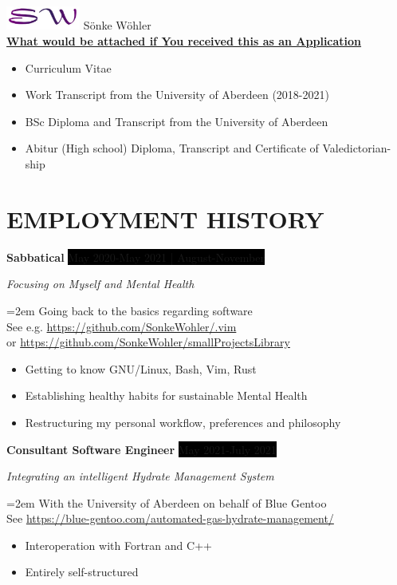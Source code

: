 \documentclass[paper=a4,fontsize=11pt]{scrartcl} %
\newcommand{\sepspace}{\vspace*{1em}}    %
\newcommand{\NewPart}[1]{\section*{\uppercase{{#1}}}}
\newcommand{\EducationEntry}[4]{
  \noindent \textbf{#1} \hfill      %
    \colorbox{Black}{%
      \parbox{6em}{%
      \hfill\color{White}#2}} \par  %
      \noindent \textit{#3} \par        %
      \noindent\hangindent=2em\hangafter=0 \small #4 %
    \normalsize \par}
\newcommand{\WorkEntry}[4]{          %
  \noindent \textbf{#1} \hfill      %
  \colorbox{Black}{\color{White}#2} \par  %
  \noindent \textit{#3} \par              %
  \noindent\hangindent=2em\hangafter=0 \small #4 %
  \normalsize \par}
\begin{document}
  \sepspace

  \includegraphics[height=0.78cm]{signature}\hspace{2.5cm}
  \hfill
  \MyDate
  \vspace{5pt}
  S\"onke W\"ohler  \\

  \vfill
  \footnotesize
  \textbf{\underline{What would be attached if You received this as an Application}}
  \begin{itemize}[noitemsep,topsep=0pt]
    \item Curriculum Vitae
    \item Work Transcript from the University of Aberdeen (2018-2021)
    \item BSc Diploma and Transcript from the University of Aberdeen
    \item Abitur (High school) Diploma, Transcript and Certificate of Valedictorian-ship
  \end{itemize}


  \StylisedName
  \SameAddress

\sepspace

\NewPart{Employment History}{}

\WorkEntry{Sabbatical}{May 2020-May 2021 | August-November}{Focusing on
  Myself and Mental Health}{Going back to the basics regarding software \\
  \hspace{5pt}
  \footnotesize See
  e.g. \textcolor{headerColor}{\url{https://github.com/SonkeWohler/.vim}}  \\
  or
  \textcolor{headerColor}{\url{https://github.com/SonkeWohler/smallProjectsLibrary}}
  \vspace{5pt}
  \begin{itemize}[noitemsep,topsep=0pt]
    \item Getting to know GNU/Linux, Bash, Vim, Rust
    \item Establishing healthy habits for sustainable Mental Health
    \item Restructuring my personal workflow, preferences and philosophy
  \end{itemize}
}

\sepspace

\WorkEntry{Consultant Software Engineer}{May 2021-July 2021}{Integrating an intelligent
Hydrate Management System}{With the University of Aberdeen on behalf of Blue
Gentoo \\
\hspace{5pt} \footnotesize See
\textcolor{headerColor}{\url{https://blue-gentoo.com/automated-gas-hydrate-management/}}
\vspace{5pt}
\begin{itemize}[noitemsep,topsep=0pt]
  \item Interoperation with Fortran and C++
  \item Entirely self-structured
\end{itemize}
}
\end{document}
